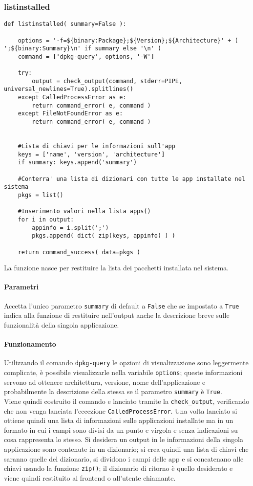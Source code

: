 \documentclass[11pt]{article}
\begin{document}
\subsubsection{listinstalled}\label{listinstalled}
\begin{lstlisting}
def listinstalled( summary=False ):

    options = '-f=${binary:Package};${Version};${Architecture}' + ( ';${binary:Summary}\n' if summary else '\n' )
    command = ['dpkg-query', options, '-W']

    try:
        output = check_output(command, stderr=PIPE, universal_newlines=True).splitlines()
    except CalledProcessError as e:
        return command_error( e, command )
    except FileNotFoundError as e:
        return command_error( e, command )


    #Lista di chiavi per le informazioni sull'app
    keys = ['name', 'version', 'architecture']
    if summary: keys.append('summary')
    
    #Conterra' una lista di dizionari con tutte le app installate nel sistema
    pkgs = list()

    #Inserimento valori nella lista apps()
    for i in output:
        appinfo = i.split(';')
        pkgs.append( dict( zip(keys, appinfo) ) )

    return command_success( data=pkgs )
\end{lstlisting}
La funzione nasce per restituire la lista dei pacchetti installata nel sistema.
\paragraph{Parametri}
Accetta l'unico parametro \texttt{summary} di default a \texttt{False} che se impostato a \texttt{True} indica
alla funzione di restituire nell'output anche la descrizione breve sulle funzionalità della singola applicazione.
\paragraph{Funzionamento}
Utilizzando il comando \texttt{dpkg-query} le opzioni di visualizzazione sono leggermente complicate, è possibile visualizzarle
nella variabile \texttt{options}; queste informazioni servono ad ottenere architettura, versione, nome dell'applicazione
e probabilmente la descrizione della stessa se il parametro \texttt{summary} è \texttt{True}.\\
Viene quindi costruito il comando e lanciato tramite la \texttt{check\_output}, verificando che non venga lanciata l'eccezione
\texttt{CalledProcessError}. Una volta lanciato si ottiene quindi una lista di informazioni sulle applicazioni installate
ma in un formato in cui i campi sono divisi da un punto e virgola e senza indicazioni su cosa rappresenta lo stesso.
Si desidera un output in le informazioni della singola applicazione sono contenute in un dizionario; si crea quindi
una lista di chiavi che saranno quelle del dizionario, si dividono i campi delle app e si concatenano alle chiavi
usando la funzione \texttt{zip()}; il dizionario di ritorno è quello desiderato e viene quindi restituito al frontend
o all'utente chiamante.
\end{document}
